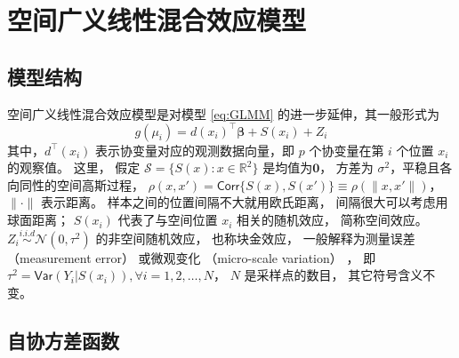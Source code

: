 \documentclass[12pt,a4paper,UTF8,twoside]{book}
\theoremstyle{definition}
\theoremstyle{definition}
\theoremstyle{definition}
\theoremstyle{remark}
\begin{document}
\hypertarget{sec:Spatial-Generalized-linear-mixed-effects-models}{%
\section{空间广义线性混合效应模型}\label{sec:Spatial-Generalized-linear-mixed-effects-models}}

\hypertarget{subsec:structure-sglmm}{%
\subsection{模型结构}\label{subsec:structure-sglmm}}

空间广义线性混合效应模型是对模型 \eqref{eq:GLMM} 的进一步延伸，其一般形式为
\begin{equation}
g(\mu_i) = d(x_i)^{\top}\boldsymbol{\beta} + S(x_i) + Z_i \label{eq:SGLMM}
\end{equation}
\noindent 其中，\(d^{\top}(x_i)\) 表示协变量对应的观测数据向量，即 \(p\) 个协变量在第 \(i\) 个位置 \(x_i\) 的观察值。 这里， 假定 \(\mathcal{S} = \{S(x): x \in \mathbb{R}^2\}\) 是均值为\(\mathbf{0}\)， 方差为 \(\sigma^2\)，平稳且各向同性的空间高斯过程， \(\rho(x,x') = \mathsf{Corr}\{S(x),S(x')\} \equiv \rho(\|x,x'\|)\)， \(\|\cdot\|\) 表示距离。 样本之间的位置间隔不大就用欧氏距离， 间隔很大可以考虑用球面距离； \(S(x_i)\) 代表了与空间位置 \(x_i\) 相关的随机效应， 简称空间效应。 \(Z_i \stackrel{i.i.d}{\sim} \mathcal{N}(0,\tau^2)\) 的非空间随机效应， 也称块金效应， 一般解释为测量误差 （measurement error） 或微观变化 （micro-scale variation） \citep{Christensen2004}， 即 \(\tau^2=\mathsf{Var}(Y_{i}|S(x_{i})),\forall i = 1,2, \ldots, N\)， \(N\) 是采样点的数目， 其它符号含义不变。

\hypertarget{subsec:covariance-function}{%
\subsection{自协方差函数}\label{subsec:covariance-function}}
\end{document}
